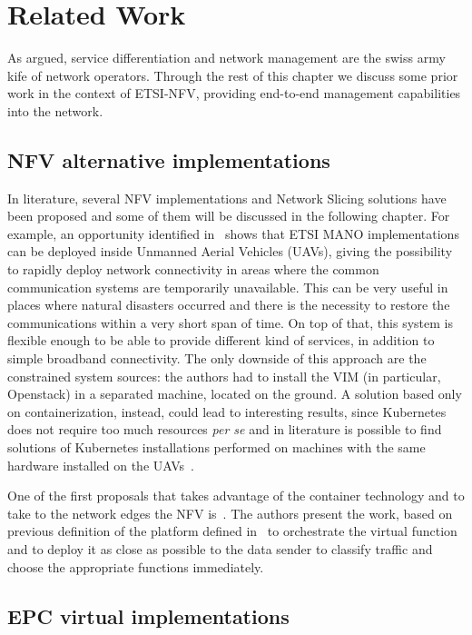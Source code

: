 \chapter{Related Work}
\label{chap:rel_wk}

As argued, service differentiation and network management are the swiss army
kife of network operators. Through the rest of this chapter we discuss some
prior work in the context of ETSI-NFV, providing end-to-end management
capabilities into the network.

\section{NFV alternative implementations}

In literature, several NFV implementations and Network Slicing solutions have been
proposed and some of them will be discussed in the following chapter. For
example, an opportunity identified in~\cite{nogales2018nfv} shows that ETSI MANO
implementations can be deployed inside Unmanned Aerial Vehicles (UAVs), giving
the possibility to rapidly deploy network connectivity in areas where the common
communication systems are temporarily unavailable. This can be very useful in
places where natural disasters occurred and there is the necessity to restore
the communications within a very short span of time. On top of that, this system
is flexible enough to be able to provide different kind of services, in addition
to simple broadband connectivity. The only downside of this approach are the
constrained system sources: the authors had to install the VIM (in particular,
Openstack) in a separated machine, located on the ground. A solution based only
on containerization, instead, could lead to interesting results, since
Kubernetes does not require too much resources \textit{per se} and in literature
is possible to find solutions of Kubernetes installations performed on machines
with the same hardware installed on the UAVs~\cite{pahl2016container}.

One of the first proposals that takes advantage of the container technology and
to take to the network edges the NFV is~\cite{cziva2017container}. The authors
present the work, based on previous definition of the platform defined
in~\cite{cziva2015container} to orchestrate the virtual function and to deploy
it as close as possible to the data sender to classify traffic and choose the
appropriate functions immediately.

\section{EPC virtual implementations}

